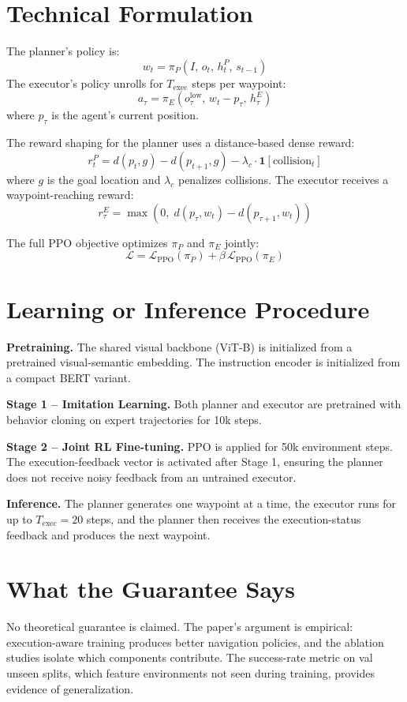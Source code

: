 \documentclass[10pt,twocolumn]{article}
\begin{document}
\section{Technical Formulation}

The planner's policy is:
\[
w_t = \pi_P\!\left(I,\, o_t,\, h_t^P,\, s_{t-1}\right)
\]
The executor's policy unrolls for $T_{\text{exec}}$ steps per waypoint:
\[
a_\tau = \pi_E\!\left(o_\tau^{\text{low}},\, w_t - p_\tau,\, h_\tau^E\right)
\]
where $p_\tau$ is the agent's current position.

The reward shaping for the planner uses a distance-based dense reward:
\[
r_t^P = d(p_t, g) - d(p_{t+1}, g) - \lambda_c \cdot \mathbf{1}[\text{collision}_t]
\]
where $g$ is the goal location and $\lambda_c$ penalizes collisions.
The executor receives a waypoint-reaching reward:
\[
r_\tau^E = \max\!\left(0,\; d(p_\tau, w_t) - d(p_{\tau+1}, w_t)\right)
\]

The full PPO objective optimizes $\pi_P$ and $\pi_E$ jointly:
\[
\mathcal{L} = \mathcal{L}_{\text{PPO}}(\pi_P) + \beta\,
  \mathcal{L}_{\text{PPO}}(\pi_E)
\]

\section{Learning or Inference Procedure}

\textbf{Pretraining.} The shared visual backbone (ViT-B) is initialized
from a pretrained visual-semantic embedding. The instruction encoder
is initialized from a compact BERT variant.

\textbf{Stage 1 -- Imitation Learning.} Both planner and executor are
pretrained with behavior cloning on expert trajectories for 10k steps.

\textbf{Stage 2 -- Joint RL Fine-tuning.} PPO is applied for 50k
environment steps. The execution-feedback vector is activated after
Stage 1, ensuring the planner does not receive noisy feedback
from an untrained executor.

\textbf{Inference.} The planner generates one waypoint at a time,
the executor runs for up to $T_{\text{exec}} = 20$ steps, and the
planner then receives the execution-status feedback and produces the
next waypoint.

\section{What the Guarantee Says}

No theoretical guarantee is claimed. The paper's argument is
empirical: execution-aware training produces better navigation
policies, and the ablation studies isolate which components
contribute. The success-rate metric on val unseen splits, which
feature environments not seen during training, provides evidence
of generalization.
\end{document}
